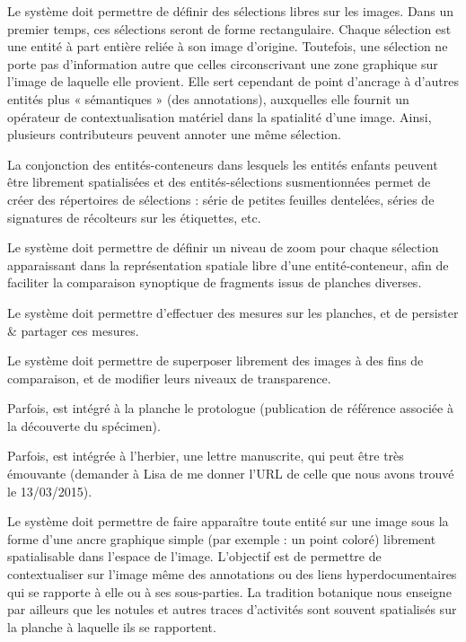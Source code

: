 \startchapter[title={Travail sur les images}]

\exig{}
Le système doit permettre de définir des sélections libres sur les images.
Dans un premier temps, ces sélections seront de forme rectangulaire.
Chaque sélection est une entité à part entière reliée à son image d'origine.
Toutefois, une sélection ne porte pas d'information autre que celles circonscrivant une zone graphique sur l'image de laquelle elle provient.
Elle sert cependant de point d'ancrage à d'autres entités plus « sémantiques » (des annotations), auxquelles elle fournit un opérateur de contextualisation matériel dans la spatialité d'une image.
Ainsi, plusieurs contributeurs peuvent annoter une même sélection.

\idea{}
La conjonction des entités-conteneurs dans lesquels les entités enfants peuvent être librement spatialisées et des entités-sélections susmentionnées permet de créer des répertoires de sélections : série de petites feuilles dentelées, séries de signatures de récolteurs sur les étiquettes, etc.

\exig{}
Le système doit permettre de définir un niveau de zoom pour chaque sélection apparaissant dans la représentation spatiale libre d'une entité-conteneur, afin de faciliter la comparaison synoptique de fragments issus de planches diverses.

\exig{}
Le système doit permettre d'effectuer des mesures sur les planches, et de persister & partager ces mesures.

\exig{}
Le système doit permettre de superposer librement des images à des fins de comparaison, et de modifier leurs niveaux de transparence.

\idea{}
Parfois, est intégré à la planche le protologue (publication de référence associée à la découverte du spécimen).

\idea{}
Parfois, est intégrée à l'herbier, une lettre manuscrite, qui peut être très émouvante (demander à Lisa de me donner l'URL de celle que nous avons trouvé le 13/03/2015).

\exig{}
Le système doit permettre de faire apparaître toute entité sur une image sous la forme d'une ancre graphique simple (par exemple : un point coloré) librement spatialisable dans l'espace de l'image.
L'objectif est de permettre de contextualiser sur l'image même des annotations ou des liens hyperdocumentaires qui se rapporte à elle ou à ses sous-parties.
La tradition botanique nous enseigne par ailleurs que les notules et autres  traces d'activités sont souvent spatialisés sur la planche à laquelle ils se rapportent.